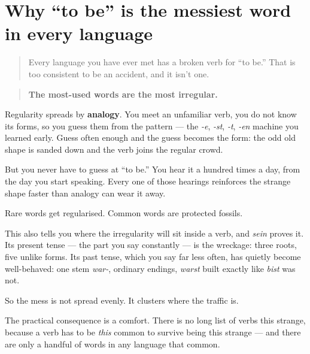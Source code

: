 \section[warum sein unregelmäßig ist]{Why \textquotedblleft{}to be\textquotedblright{} is the messiest word in every language}

\label{lesson:GE-C16-haeufig-unregelmaessig}



\begin{quote}
Every language you have ever met has a broken verb for \textquotedblleft{}to be.\textquotedblright{} That is too consistent to be an accident, and it isn't one.
\end{quote}

\begin{grammarlens}[title={Grammar Lens: frequency protects irregularity}]
\begin{quote}
\textbf{The most-used words are the most irregular.}
\end{quote}

Regularity spreads by \textbf{analogy}. You meet an unfamiliar verb, you do not know its forms, so you guess them from the pattern — the \emph{-e}, \emph{-st}, \emph{-t}, \emph{-en} machine you learned early. Guess often enough and the guess becomes the form: the odd old shape is sanded down and the verb joins the regular crowd.

But you never have to guess at \textquotedblleft{}to be.\textquotedblright{} You hear it a hundred times a day, from the day you start speaking. Every one of those hearings reinforces the strange shape faster than analogy can wear it away.

Rare words get regularised. Common words are protected fossils.
\end{grammarlens}

\begin{culture}
This also tells you where the irregularity will sit inside a verb, and \emph{sein} proves it. Its present tense — the part you say constantly — is the wreckage: three roots, five unlike forms. Its past tense, which you say far less often, has quietly become well-behaved: one stem \emph{war-}, ordinary endings, \emph{warst} built exactly like \emph{bist} was not.

So the mess is not spread evenly. It clusters where the traffic is.

The practical consequence is a comfort. There is no long list of verbs this strange, because a verb has to be \emph{this} common to survive being this strange — and there are only a handful of words in any language that common.
\end{culture}

